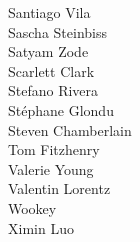 \documentclass[14pt,aspectratio=169]{beamer}
\begin{document}
\begin{frame}
\begin{center}
\begin{columns}
    {Santiago Vila} \\
    {Sascha Steinbiss} \\
    {Satyam Zode} \\
    {Scarlett Clark} \\
    {Stefano Rivera} \\
    {Stéphane Glondu} \\
    {Steven Chamberlain} \\
    Tom Fitzhenry \\
    {Valerie Young} \\
    Valentin Lorentz \\
    {Wookey} \\
    {Ximin Luo} \\
  \end{columns}
 \end{center}
\end{frame}
\end{document}
